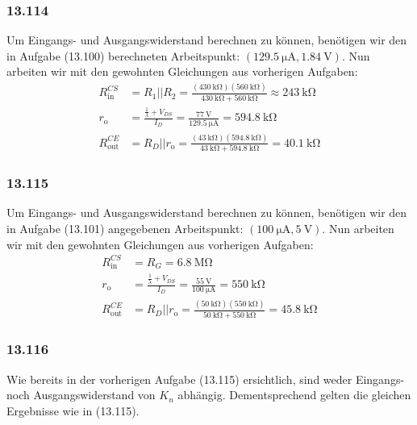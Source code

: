 \documentclass[11pt,a4paper,titlepage]{article}
\begin{document}
\subsubsection*{13.114}
Um Eingangs- und Ausgangswiderstand berechnen zu können, benötigen wir den in Aufgabe (13.100) berechneten Arbeitspunkt: $(\SI{129.5}{\micro\ampere},\SI{1.84}{\volt})$. Nun arbeiten wir mit den gewohnten Gleichungen aus vorherigen Aufgaben:
\begin{equation}
\begin{aligned}
R_{\text{in}}^{CS} &= R_1 || R_2 = \frac{(\SI{430}{\kilo\ohm})(\SI{560}{\kilo\ohm})}{\SI{430}{\kilo\ohm} + \SI{560}{\kilo\ohm}} \approx \SI{243}{\kilo\ohm} \\
r_{\text{o}} &= \frac{\frac{1}{\lambda}+V_{DS}}{I_D} = \frac{\SI{77}{\volt}}{\SI{129.5}{\micro\ampere}} = \SI{594.8}{\kilo\ohm} \\
R_{\text{out}}^{CE} &= R_D || r_{\text{o}} = \frac{(\SI{43}{\kilo\ohm})(\SI{594.8}{\kilo\ohm})}{\SI{43}{\kilo\ohm} + \SI{594.8}{\kilo\ohm}} = \SI{40.1}{\kilo\ohm}
\end{aligned}
\end{equation}

\subsubsection*{13.115}
Um Eingangs- und Ausgangswiderstand berechnen zu können, benötigen wir den in Aufgabe (13.101) angegebenen Arbeitspunkt: $(\SI{100}{\micro\ampere},\SI{5}{\volt})$. Nun arbeiten wir mit den gewohnten Gleichungen aus vorherigen Aufgaben:
\begin{equation}
\begin{aligned}
R_{\text{in}}^{CS} &= R_G = \SI{6.8}{\mega\ohm}\\
r_{\text{o}} &= \frac{\frac{1}{\lambda}+V_{DS}}{I_D} = \frac{\SI{55}{\volt}}{\SI{100}{\micro\ampere}} = \SI{550}{\kilo\ohm} \\
R_{\text{out}}^{CE} &= R_D || r_{\text{o}} = \frac{(\SI{50}{\kilo\ohm})(\SI{550}{\kilo\ohm})}{\SI{50}{\kilo\ohm} + \SI{550}{\kilo\ohm}} = \SI{45.8}{\kilo\ohm}
\end{aligned}
\end{equation}

\subsubsection*{13.116}
Wie bereits in der vorherigen Aufgabe (13.115) ersichtlich, sind weder Eingangs- noch Ausgangswiderstand von $K_n$ abhängig. Dementsprechend gelten die gleichen Ergebnisse wie in (13.115).
\end{document}
